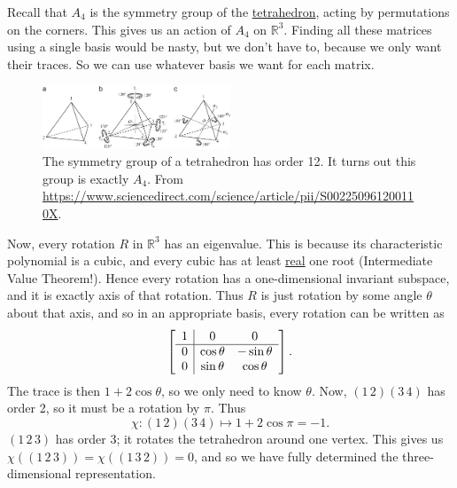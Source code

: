 \documentclass[12pt]{article}
\newcommand{\real}{\mathbb{R}}
\theoremstyle{definition}
\begin{document}
Recall that $A_4$ is the symmetry group of the \underline{tetrahedron}, acting by permutations on the corners. This gives us an action of $A_4$ on $\real^3$. Finding all these matrices using a single basis would be nasty, but we don't have to, because we only want their traces. So we can use whatever basis we want for each matrix.
\begin{figure}[H]
    \centering
    \includegraphics[width = 0.5\textwidth]{3.jpg}
    \caption{The symmetry group of a tetrahedron has order 12. It turns out this group is exactly $A_4$. From \url{https://www.sciencedirect.com/science/article/pii/S002250961200110X}.}
    \label{fig:Figure3}
\end{figure}
Now, every rotation $R$ in $\real^3$ has an eigenvalue. This is because its characteristic polynomial is a cubic, and every cubic has at least \underline{real} one root (Intermediate Value Theorem!). Hence every rotation has a one-dimensional invariant subspace, and it is exactly axis of that rotation. Thus $R$ is just rotation by some angle $\theta$ about that axis, and so in an appropriate basis, every rotation can be written as 
\begin{equation}
    \left[
        \begin{array}{c | c c}
            1 & 0 & 0 \\
            \hline 
            0 & \cos \theta & -\sin \theta \\
            0 & \sin \theta & \cos \theta
        \end{array}
    \right].
\end{equation}
The trace is then $1 + 2\cos \theta$, so we only need to know $\theta$. Now, $(1\,2)(3\,4)$ has order 2, so it must be a rotation by $\pi$. Thus 
\begin{equation}
    \chi : (1\,2)(3\,4) \mapsto 1 + 2 \cos \pi = -1.
\end{equation}
$(1\,2\,3)$ has order 3; it rotates the tetrahedron around one vertex. This gives us $\chi \left( (1\,2\,3) \right) = \chi \left( (1\,3\,2) \right) = 0$, and so we have fully determined the three-dimensional representation.
\end{document}

